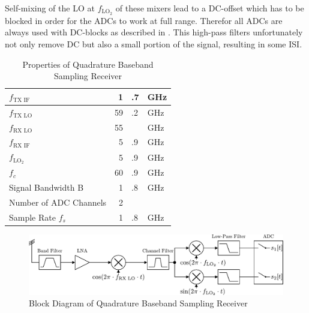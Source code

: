 Self-mixing of the \gls{LO} at $f_{\text{LO}_2}$ of these mixers lead
to a \gls{DC}-offset which has to be blocked in order for the
\glspl{ADC} to work at full range.
Therefor all \glspl{ADC} are always used with \gls{DC}-blocks as described
in . This high-pass filters unfortunately
not only remove \gls{DC} but also a small portion of the signal,
resulting in some \gls{ISI}. \\

\begin{table}[h]
  \centering
  \begin{tabular}{|l|r@{}l@{~}l|}
    \hline
    $f_{\text{TX IF}}$              & 1&.7&GHz \\ \hline
    $f_{\text{TX LO}}$              & 59&.2&GHz \\ \hline
    $f_{\text{RX LO}}$              & 55&&GHz \\ \hline
    $f_{\text{RX IF}}$              & 5&.9&GHz \\ \hline
    $f_{\text{LO}_2}$               & 5&.9&GHz \\ \hline
    $f_c$                         & 60&.9&GHz \\ \hline
    Signal Bandwidth B            & 1&.8&GHz \\ \hline
    Number of \gls{ADC} Channels  & 2 && \\ \hline
    Sample Rate $f_s$ & 1&.8&GHz \\ \hline
  \end{tabular}
  \caption{Properties of Quadrature Baseband Sampling Receiver}
  \label{tab:rx_0}
\end{table}

\begin{figure}[h!]
  \centering
  \includegraphics[width=\textwidth]{figures/rx_0_bd}
  \caption{Block Diagram of Quadrature Baseband Sampling Receiver}
  \label{fig:rx_0_bd}
\end{figure}

